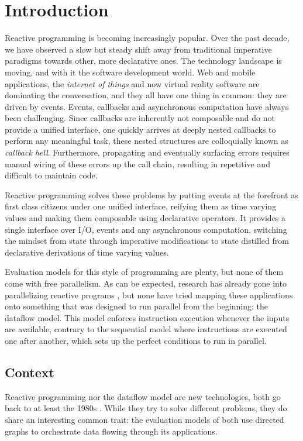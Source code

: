\chapter{Introduction}

Reactive programming is becoming increasingly popular. Over the past decade, we have observed a slow but steady shift away from traditional imperative paradigms towards other, more declarative ones.
The technology landscape is moving, and with it the software development world. Web and mobile applications, the \textit{internet of things} and now virtual reality software are dominating the conversation, and they all have one thing in common: they are driven by events. Events, callbacks and asynchronous computation have always been challenging. Since callbacks are inherently not composable and do not provide a unified interface, one quickly arrives at deeply nested callbacks to perform any meaningful task, these nested structures are colloquially known as \textit{callback hell}. Furthermore, propagating and eventually surfacing errors requires manual wiring of these errors up the call chain, resulting in repetitive and difficult to maintain code. 

Reactive programming solves these problems by putting events at the forefront as first class citizens under one unified interface, reifying them as time varying values and making them composable using declarative operators. It provides a single interface over I/O, events and any asynchronous computation, switching the mindset from state through imperative modifications to state distilled from declarative derivations of time varying values. 

Evaluation models for this style of programming are plenty, but none of them come with free parallelism. As can be expected, research has already gone into parallelizing reactive programs \citep{peterson_parallel_2000}, but none have tried mapping these applications onto something that was designed to run parallel from the beginning: the dataflow model. 
This model enforces instruction execution whenever the inputs are available, contrary to the sequential model where instructions are executed one after another, which sets up the perfect conditions to run in parallel.

\section{Context}

Reactive programming nor the dataflow model are new technologies, both go back to at least the 1980s \citep{harel_development_1985, veen_dataflow_1986}. While they try to solve different problems, they do share an interesting common trait: the evaluation models of both use directed graphs to orchestrate data flowing through its applications. 


